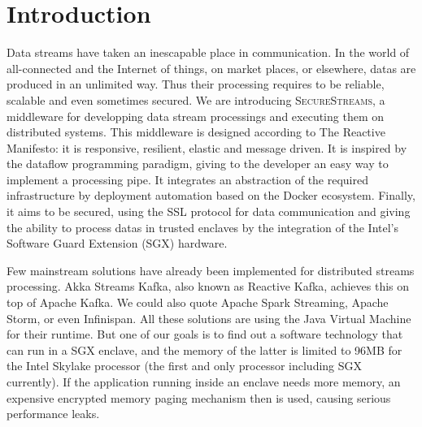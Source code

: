 \section{Introduction}
\label{sec:introduction}


Data streams have taken an inescapable place in communication.
In the world of all-connected and the Internet of things, on market places, or elsewhere, datas are produced in an unlimited way.
Thus their processing requires to be reliable, scalable and even sometimes secured.
We are introducing \textsc{SecureStreams}, a middleware for developping data stream processings and executing them on distributed systems.
This middleware is designed according to The Reactive Manifesto: it is responsive, resilient, elastic and message driven\cite{reactivemanifesto}.
It is inspired by the dataflow programming paradigm, giving to the developer an easy way to implement a processing pipe.
It integrates an abstraction of the required infrastructure by deployment automation based on the Docker ecosystem.
Finally, it aims to be secured, using the SSL protocol for data communication and giving the ability to process datas in trusted enclaves by the integration of the Intel's Software Guard Extension (SGX) hardware.

Few mainstream solutions have already been implemented for distributed streams processing.
Akka Streams Kafka, also known as Reactive Kafka\cite{reactivekafka}, achieves this on top of Apache Kafka\cite{apachekafka}.
We could also quote  Apache Spark Streaming\cite{apachesparkstreaming}, Apache Storm\cite{apachestorm}, or even Infinispan\cite{infinispan}.
All these solutions are using the Java Virtual Machine for their runtime.
But one of our goals is to find out a software technology that can run in a SGX enclave, and the memory of the latter is limited to 96MB for the Intel Skylake processor (the first and only processor including SGX currently)\cite{costan_intel}.
If the application running inside an enclave needs more memory, an expensive encrypted memory paging mechanism then is used, causing serious performance leaks\cite{brenner_securekeeper:_2016}.
